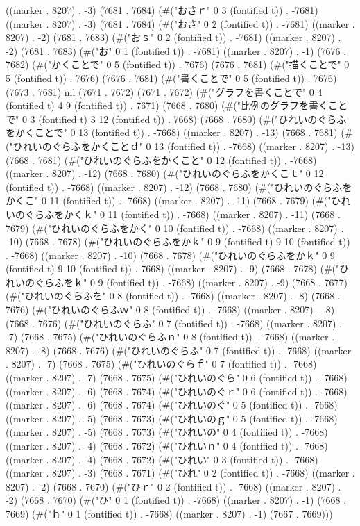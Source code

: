 ((marker . 8207) . -3) (7681 . 7684) (#("おさｒ" 0 3 (fontified t)) . -7681) ((marker . 8207) . -3) (7681 . 7684) (#("おさ" 0 2 (fontified t)) . -7681) ((marker . 8207) . -2) (7681 . 7683) (#("おｓ" 0 2 (fontified t)) . -7681) ((marker . 8207) . -2) (7681 . 7683) (#("お" 0 1 (fontified t)) . -7681) ((marker . 8207) . -1) (7676 . 7682) (#("かくことで" 0 5 (fontified t)) . 7676) (7676 . 7681) (#("描くことで" 0 5 (fontified t)) . 7676) (7676 . 7681) (#("書くことで" 0 5 (fontified t)) . 7676) (7673 . 7681) nil (7671 . 7672) (7671 . 7672) (#("グラフを書くことで" 0 4 (fontified t) 4 9 (fontified t)) . 7671) (7668 . 7680) (#("比例のグラフを書くことで" 0 3 (fontified t) 3 12 (fontified t)) . 7668) (7668 . 7680) (#("ひれいのぐらふをかくことで" 0 13 (fontified t)) . -7668) ((marker . 8207) . -13) (7668 . 7681) (#("ひれいのぐらふをかくことｄ" 0 13 (fontified t)) . -7668) ((marker . 8207) . -13) (7668 . 7681) (#("ひれいのぐらふをかくこと" 0 12 (fontified t)) . -7668) ((marker . 8207) . -12) (7668 . 7680) (#("ひれいのぐらふをかくこｔ" 0 12 (fontified t)) . -7668) ((marker . 8207) . -12) (7668 . 7680) (#("ひれいのぐらふをかくこ" 0 11 (fontified t)) . -7668) ((marker . 8207) . -11) (7668 . 7679) (#("ひれいのぐらふをかくｋ" 0 11 (fontified t)) . -7668) ((marker . 8207) . -11) (7668 . 7679) (#("ひれいのぐらふをかく" 0 10 (fontified t)) . -7668) ((marker . 8207) . -10) (7668 . 7678) (#("ひれいのぐらふをかｋ" 0 9 (fontified t) 9 10 (fontified t)) . -7668) ((marker . 8207) . -10) (7668 . 7678) (#("ひれいのぐらふをかｋ" 0 9 (fontified t) 9 10 (fontified t)) . 7668) ((marker . 8207) . -9) (7668 . 7678) (#("ひれいのぐらふをｋ" 0 9 (fontified t)) . -7668) ((marker . 8207) . -9) (7668 . 7677) (#("ひれいのぐらふを" 0 8 (fontified t)) . -7668) ((marker . 8207) . -8) (7668 . 7676) (#("ひれいのぐらふｗ" 0 8 (fontified t)) . -7668) ((marker . 8207) . -8) (7668 . 7676) (#("ひれいのぐらふ" 0 7 (fontified t)) . -7668) ((marker . 8207) . -7) (7668 . 7675) (#("ひれいのぐらふｎ" 0 8 (fontified t)) . -7668) ((marker . 8207) . -8) (7668 . 7676) (#("ひれいのぐらふ" 0 7 (fontified t)) . -7668) ((marker . 8207) . -7) (7668 . 7675) (#("ひれいのぐらｆ" 0 7 (fontified t)) . -7668) ((marker . 8207) . -7) (7668 . 7675) (#("ひれいのぐら" 0 6 (fontified t)) . -7668) ((marker . 8207) . -6) (7668 . 7674) (#("ひれいのぐｒ" 0 6 (fontified t)) . -7668) ((marker . 8207) . -6) (7668 . 7674) (#("ひれいのぐ" 0 5 (fontified t)) . -7668) ((marker . 8207) . -5) (7668 . 7673) (#("ひれいのｇ" 0 5 (fontified t)) . -7668) ((marker . 8207) . -5) (7668 . 7673) (#("ひれいの" 0 4 (fontified t)) . -7668) ((marker . 8207) . -4) (7668 . 7672) (#("ひれいｎ" 0 4 (fontified t)) . -7668) ((marker . 8207) . -4) (7668 . 7672) (#("ひれい" 0 3 (fontified t)) . -7668) ((marker . 8207) . -3) (7668 . 7671) (#("ひれ" 0 2 (fontified t)) . -7668) ((marker . 8207) . -2) (7668 . 7670) (#("ひｒ" 0 2 (fontified t)) . -7668) ((marker . 8207) . -2) (7668 . 7670) (#("ひ" 0 1 (fontified t)) . -7668) ((marker . 8207) . -1) (7668 . 7669) (#("ｈ" 0 1 (fontified t)) . -7668) ((marker . 8207) . -1) (7667 . 7669)))

